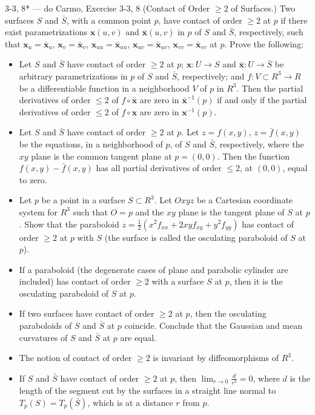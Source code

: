 \begin{exercise}{3-3, 8* — do Carmo, Exercise 3-3, 8}
(Contact of Order $\geq 2$ of Surfaces.) Two surfaces $S$ and $\bar{S}$, with a common point $p$, have contact of order $\geq 2$ at $p$ if there exist parametrizations $\mathbf{x}(u, v)$ and $\bar{\mathbf{x}}(u, v)$ in $p$ of $S$ and $\bar{S}$, respectively, such that $\mathbf{x} _ {u} = \bar {\mathbf{x}} _ {u}$, $\mathbf{x} _ {v} = \bar {\mathbf{x}} _ {v}$, $\mathbf{x} _ {u u} = \bar {\mathbf{x}} _ {u u}$, $\mathbf{x} _ {u v} = \bar {\mathbf{x}} _ {u v}$, $\mathbf{x} _ {v v} = \bar {\mathbf{x}} _ {v v}$ at $p$. Prove the following:
\begin{itemize}
\item[a.] Let $S$ and $\bar{S}$ have contact of order $\geq 2$ at $p$; $\mathbf{x} \colon U \to S$ and $\bar{\mathbf{x}} \colon U \to \bar{S}$ be arbitrary parametrizations in $p$ of $S$ and $\bar{S}$, respectively; and $f \colon V \subset R^3 \to R$ be a differentiable function in a neighborhood $V$ of $p$ in $R^3$. Then the partial derivatives of order $\leq 2$ of $f \circ \bar{\mathbf{x}}$ are zero in $\bar{\mathbf{x}}^{-1}(p)$ if and only if the partial derivatives of order $\leq 2$ of $f \circ \mathbf{x}$ are zero in $\mathbf{x}^{-1}(p)$.
\item[b.] Let $S$ and $\bar{S}$ have contact of order $\geq 2$ at $p$. Let $z = f(x,y)$, $z = \bar{f}(x,y)$ be the equations, in a neighborhood of $p$, of $S$ and $\bar{S}$, respectively, where the $xy$ plane is the common tangent plane at $p = (0,0)$. Then the function $f(x,y) - \bar{f}(x,y)$ has all partial derivatives of order $\leq 2$, at $(0,0)$, equal to zero.
\item[c.] Let $p$ be a point in a surface $S \subset R^3$. Let $Oxyz$ be a Cartesian coordinate system for $R^3$ such that $O = p$ and the $xy$ plane is the tangent plane of $S$ at $p$. Show that the paraboloid $z = \frac {1}{2} \left(x ^ {2} f _ {x x} + 2 x y f _ {x y} + y ^ {2} f _ {y y}\right)$ has contact of order $\geq 2$ at $p$ with $S$ (the surface is called the osculating paraboloid of $S$ at $p$).
\item[d.] If a paraboloid (the degenerate cases of plane and parabolic cylinder are included) has contact of order $\geq 2$ with a surface $S$ at $p$, then it is the osculating paraboloid of $S$ at $p$.
\item[e.] If two surfaces have contact of order $\geq 2$ at $p$, then the osculating paraboloids of $S$ and $\bar{S}$ at $p$ coincide. Conclude that the Gaussian and mean curvatures of $S$ and $\bar{S}$ at $p$ are equal.
\item[f.] The notion of contact of order $\geq 2$ is invariant by diffeomorphisms of $R^3$.
\item[g.] If $S$ and $\bar{S}$ have contact of order $\geq 2$ at $p$, then $\lim _ {r \rightarrow 0} \frac {d}{r ^ {2}} = 0$, where $d$ is the length of the segment cut by the surfaces in a straight line normal to $T_{p}(S) = T_{p}(\bar{S})$, which is at a distance $r$ from $p$.
\end{itemize}
\end{exercise}


